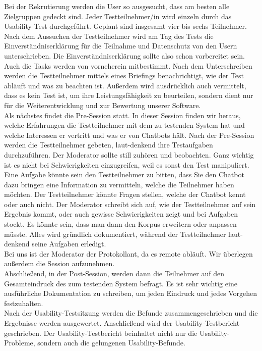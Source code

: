 \noindent Bei der Rekrutierung werden die User so ausgesucht, dass am besten alle Zielgruppen gedeckt sind. Jeder Testteilnehmer/in wird einzeln durch das Usability Test durchgeführt. 
Geplant sind insgesamt vier bis sechs Teilnehmer. Nach dem Aussuchen der Testteilnehmer wird am Tag des Tests die Einverständniserklärung für die Teilnahme und Datenschutz von den Usern unterschrieben. 
Die Einverständniserklärung sollte also schon vorbereitet sein. Auch die Tasks werden von vorneherein mitbestimmt. Nach dem Unterschreiben werden die Testteilnehmer mittels eines Briefings benachrichtigt, wie der Test abläuft und was zu beachten ist. 
Außerdem wird ausdrücklich auch vermittelt, dass es kein Test ist, um ihre Leistungsfähigkeit zu beurteilen, sondern dient nur für die Weiterentwicklung und zur Bewertung unserer Software.
\\

\noindent Als nächstes findet die Pre-Session statt. In dieser Session finden wir heraus, welche Erfahrungen die Testteilnehmer mit dem zu testenden System hat und welche Interessen er vertritt und was er von Chatbots hält. 
Nach der Pre-Session werden die Testteilnehmer gebeten, laut-denkend ihre Testaufgaben durchzuführen. 
Der Moderator sollte still zuhören und beobachten. Ganz wichtig ist es nicht bei Schwierigkeiten einzugreifen, weil es sonst den Test manipuliert.
\\

\noindent Eine Aufgabe könnte sein den Testteilnehmer zu bitten, dass Sie den Chatbot dazu bringen eine Information zu vermitteln, welche die Teilnehmer haben möchten. 
Der Testteilnehmer könnte Fragen stellen, welche der Chatbot kennt oder auch nicht. 
Der Moderator schreibt sich auf, wie der Testteilnehmer auf sein Ergebnis kommt, oder auch gewisse Schwierigkeiten zeigt und bei Aufgaben stockt. 
Es könnte sein, dass man dann den Korpus erweitern oder anpassen müsste. 
Alles wird gründlich dokumentiert, während der Testteilnehmer laut-denkend seine Aufgaben erledigt.
\\

\noindent Bei uns ist der Moderator der Protokollant, da es remote abläuft. Wir überlegen außerdem die Session aufzunehmen. 
\\

\noindent Abschließend, in der Post-Session, werden dann die Teilnehmer auf den Gesamteindruck des zum testenden System befragt. 
Es ist sehr wichtig eine ausführliche Dokumentation zu schreiben, um jeden Eindruck und jedes Vorgehen festzuhalten.
\\

\noindent Nach der Usability-Testsitzung werden die Befunde zusammengeschrieben und die Ergebnisse werden ausgewertet. 
Anschließend wird der Usability-Testbericht geschrieben. 
Der Usability-Testbericht beinhaltet nicht nur die Usability-Probleme, sondern auch die gelungenen Usability-Befunde.

